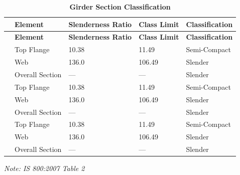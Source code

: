 \documentclass[12pt,a4paper]{report}
\numberwithin{table}{chapter}
\numberwithin{figure}{chapter}
\begin{document}
\vspace{1em}
\begin{longtable}{|C{2.5cm}|L{3cm}|C{3.5cm}|C{2.5cm}|>{\centering\arraybackslash}p{4.0cm}|}
\caption{\textbf{Girder Section Classification}}\\
\hline
\textbf{} & \textbf{Element} & \textbf{Slenderness Ratio} & \textbf{Class Limit} & \textbf{Classification} \\[6pt]
\hline
\endfirsthead

\hline
\textbf{} & \textbf{Element} & \textbf{Slenderness Ratio} & \textbf{Class Limit} & \textbf{Classification} \\[6pt]
\hline
\endhead
\hline
\endlastfoot
{} & Top Flange & 10.38 & 11.49 & Semi-Compact \\[6pt]
 & Web & 136.0 & 106.49 & Slender \\[6pt]
 & Overall Section & --- & --- & Slender \\[6pt]
\hline
{} & Top Flange & 10.38 & 11.49 & Semi-Compact \\[6pt]
 & Web & 136.0 & 106.49 & Slender \\[6pt]
 & Overall Section & --- & --- & Slender \\[6pt]
\hline
{} & Top Flange & 10.38 & 11.49 & Semi-Compact \\[6pt]
 & Web & 136.0 & 106.49 & Slender \\[6pt]
 & Overall Section & --- & --- & Slender \\[6pt]
\end{longtable}
\noindent\textit{Note: IS 800:2007 Table 2}
\end{document}
